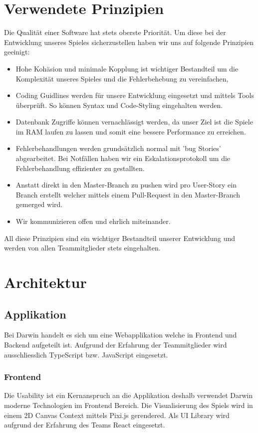 \documentclass[a4paper, 11pt]{scrartcl}
\let\oldsection\section
\renewcommand\section{\clearpage\oldsection}
\begin{document}
\section{Verwendete Prinzipien}
Die Qualität einer Software hat stets oberste Priorität. Um diese bei der Entwicklung unseres Spieles
sicherzustellen haben wir uns auf folgende Prinzipien geeinigt:
\begin{itemize}
\item Hohe Kohäsion und minimale Kopplung ist wichtiger Bestandteil um die Komplexität unseres
 Spieles und die Fehlerbehebung zu vereinfachen,
\item Coding Guidlines werden für unsere Entwicklung eingesetzt und mittels Tools überprüft. So können Syntax und Code-Styling eingehalten werden.
\item Datenbank Zugriffe können vernachlässigt werden, da unser Ziel ist die Spiele im RAM laufen zu lassen und somit eine bessere Performance zu erreichen.
\item Fehlerbehandlungen werden grundsätzlich normal mit 'bug Stories' abgearbeitet. Bei Notfällen haben wir ein Eskalationsprotokoll um die Fehlerbehandlung effizienter zu gestallten.
\item Anstatt direkt in den Master-Branch zu pushen wird pro User-Story ein Branch erstellt welcher mittels einem Pull-Request in den Master-Branch gemerged wird.
\item Wir kommunizieren offen und ehrlich miteinander. 
\end{itemize}
All diese Prinzipien sind ein wichtiger Bestandteil unserer Entwicklung und werden von allen Teammitglieder stets eingehalten.

\section{Architektur}
\subsection{Applikation}
Bei Darwin handelt es sich um eine Webapplikation welche in Frontend und Backend aufgeteilt ist.
Aufgrund der Erfahrung der Teammitglieder wird ausschliesslich TypeScript bzw. JavaScript eingesetzt.

\subsubsection{Frontend}
Die Usability ist ein Kernanspruch an die Applikation deshalb verwendet Darwin moderne Technologien im Frontend Bereich.
Die Visualisierung des Spiels wird in einem 2D Canvas Context mittels Pixi.js gerendered.
Als UI Library wird aufgrund der Erfahrung des Teams React eingesetzt.
\end{document}
